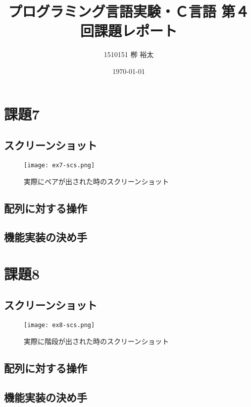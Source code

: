 \documentclass[11pt,a4paper, uplatex]{jsarticle}
\title{プログラミング言語実験・Ｃ言語 第４回課題レポート}
\author{1510151  栁 裕太}
\date{\today}
\begin{document}
\maketitle
\section{課題7}
%
\subsection{スクリーンショット}

\begin{figure}[h]
  \centering
  \caption{実際にペアが出された時のスクリーンショット}
  \texttt{[image: ex7-scs.png]}
\end{figure}

\subsection{配列に対する操作}

\subsection{機能実装の決め手}

\section{課題8}
\subsection{スクリーンショット}
\begin{figure}[h]
  \centering
  \caption{実際に階段が出された時のスクリーンショット}
  \texttt{[image: ex8-scs.png]}
\end{figure}
\subsection{配列に対する操作}
\subsection{機能実装の決め手}
%
%
\end{document}
